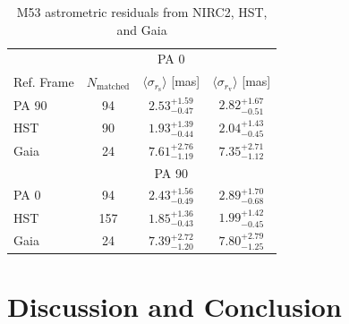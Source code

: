 \documentclass[]{spie}  %
\begin{document}
\begin{table}[!h]
\caption{M53 astrometric residuals from NIRC2, HST, and Gaia}
\setlength{\tabcolsep}{11.0pt}
\begin{center}
\begin{tabular}{lccc}
    \hline\hline
    {} & {} & \multicolumn{1}{c}{PA 0}\\
    \cmidrule(lr){2-4}
        Ref. Frame & $N_{\textrm{matched}}$ & $\langle \sigma_{r_{\textrm{s}}}\rangle$ [mas] & $\langle \sigma_{r_{\textrm{v}}}\rangle$ [mas]\\
        \hline
        PA 90 & 94 & $2.53 ^ {+1.59}_{-0.47}$ & $2.82 ^ {+1.67}_{-0.51}$\\
        HST & 90 &  $1.93 ^ {+1.39}_{-0.44}$ & $2.04 ^ {+1.43}_{-0.45}$\\
        Gaia & 24 &  $7.61 ^ {+2.76}_{-1.19}$ & $7.35 ^ {+2.71}_{-1.12}$\\
        \hline
        {} & {} & PA 90 & {}\\
        \cmidrule(lr){2-4}
        PA 0 & 94 & $2.43 ^ {+1.56}_{-0.49}$ & $2.89 ^ {+1.70}_{-0.68}$\\
        HST & 157 &  $1.85 ^ {+1.36}_{-0.43}$ & $1.99 ^ {+1.42}_{-0.45}$\\
        Gaia & 24 &  $7.39 ^ {+2.72}_{-1.20}$ & $7.80 ^ {+2.79}_{-1.25}$\\
        \hline
\end{tabular}
\end{center}
\label{tab:m53-AstromResidual-results}
\end{table}

\section{Discussion and Conclusion} \label{sec:conclusion}
\end{document}
